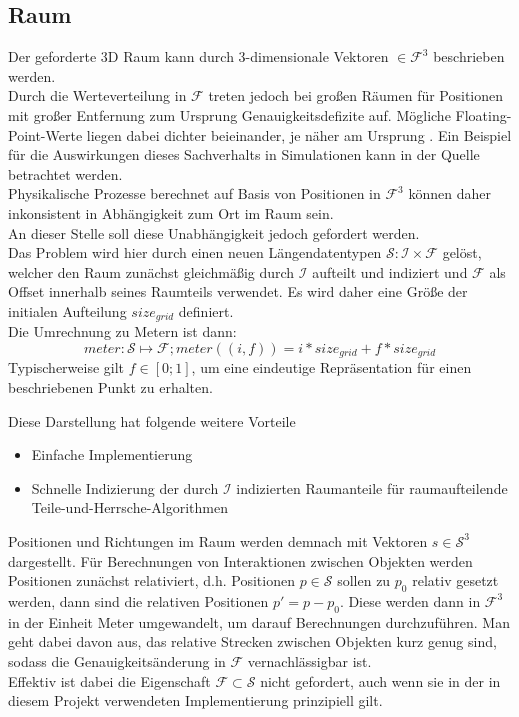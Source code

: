 \subsection{Raum}
\label{sec:space}
Der geforderte 3D Raum kann durch 3-dimensionale Vektoren $\in \mathcal{F}^3$ beschrieben werden.\\
Durch die Werteverteilung in $\mathcal{F}$ treten jedoch bei großen Räumen für Positionen mit großer Entfernung zum Ursprung Genauigkeitsdefizite auf. Mögliche Floating-Point-Werte liegen dabei dichter beieinander, je näher am Ursprung \cite{floatdistribution}. Ein Beispiel für die Auswirkungen dieses Sachverhalts in Simulationen kann in der Quelle \cite{floatdistributionexample} betrachtet werden.\\
Physikalische Prozesse berechnet auf Basis von Positionen in $\mathcal{F}^3$ können daher inkonsistent in Abhängigkeit zum Ort im Raum sein.\\
An dieser Stelle soll diese Unabhängigkeit jedoch gefordert werden.\\
Das Problem wird hier durch einen neuen Längendatentypen $\mathcal{S} : \mathcal{I} \times \mathcal{F}$ gelöst, welcher den Raum zunächst gleichmäßig durch $\mathcal{I}$ aufteilt und indiziert und $\mathcal{F}$ als Offset innerhalb seines Raumteils verwendet. Es wird daher eine Größe der initialen Aufteilung $size_{grid}$ definiert.\\
Die Umrechnung zu Metern ist dann: $$ meter: \mathcal{S} \mapsto \mathcal{F};  meter((i, f)) = i * size_{grid} + f * size_{grid}$$ 
Typischerweise gilt $f \in [0;1]$, um eine eindeutige Repräsentation für einen beschriebenen Punkt zu erhalten.

Diese Darstellung hat folgende weitere Vorteile
\begin{itemize}
\item Einfache Implementierung
\item Schnelle Indizierung der durch $\mathcal{I}$ indizierten Raumanteile für raumaufteilende Teile-und-Herrsche-Algorithmen
\end{itemize}

Positionen und Richtungen im Raum werden demnach mit Vektoren $s\in\mathcal{S}^3$ dargestellt. Für Berechnungen von Interaktionen zwischen Objekten werden Positionen zunächst relativiert, d.h. Positionen $p \in \mathcal{S}$ sollen zu $p_0$ relativ gesetzt werden, dann sind die relativen Positionen $p' = p - p_0$. Diese werden dann in $\mathcal{F}^3$ in der Einheit Meter umgewandelt, um darauf Berechnungen durchzuführen. Man geht dabei davon aus, das relative Strecken zwischen Objekten kurz genug sind, sodass die Genauigkeitsänderung in $\mathcal{F}$ vernachlässigbar ist.\\
Effektiv ist dabei die Eigenschaft $\mathcal{F}\subset\mathcal{S}$ nicht gefordert, auch wenn sie in der in diesem Projekt verwendeten Implementierung prinzipiell gilt.

